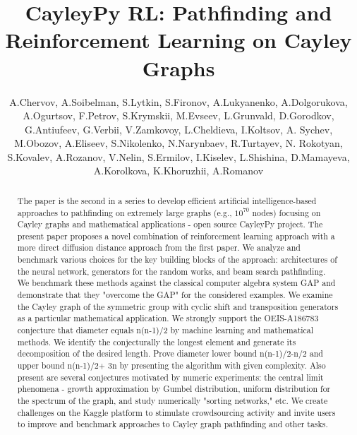 \documentclass[atmp]{ipart_v1}
\numberwithin{equation}{section}
\theoremstyle{plain}%
\begin{document}
\title[CayleyPY RL]{CayleyPy RL: Pathfinding and Reinforcement Learning on Cayley Graphs}


\author[A.Chervov,A.Soibelman,... ]{A.Chervov, 
A.Soibelman, S.Lytkin, S.Fironov, A.Lukyanenko, A.Dolgorukova, A.Ogurtsov,
F.Petrov, S.Krymskii, M.Evseev, L.Grunvald, D.Gorodkov, G.Antiufeev, G.Verbii, 
V.Zamkovoy, L.Cheldieva, I.Koltsov, A. Sychev, M.Obozov, 
A.Eliseev, S.Nikolenko, N.Narynbaev, R.Turtayev,
N. Rokotyan, S.Kovalev,
A.Rozanov, V.Nelin, S.Ermilov,
I.Kiselev, L.Shishina, D.Mamayeva, A.Korolkova,
K.Khoruzhii, A.Romanov }

\begin{abstract}


The paper is the second in a series to develop efficient artificial intelligence-based approaches to pathfinding on extremely large graphs (e.g., $10^{70}$ nodes) focusing on Cayley graphs and mathematical applications - open source CayleyPy project. The present paper proposes a novel combination of reinforcement learning approach with a more direct diffusion distance approach from the first paper. We analyze and benchmark various choices for the key building blocks of the approach:  architectures of the neural network, generators for the random works, and beam search pathfinding. We benchmark these methods against the classical computer algebra system GAP and demonstrate that they  "overcome the GAP" for the considered examples.
We examine the Cayley graph of the symmetric group with cyclic shift and transposition generators as a particular mathematical application. We strongly support the OEIS-A186783 conjecture that diameter equals n(n-1)/2 by machine learning and mathematical methods. We identify the conjecturally the longest element and generate its decomposition of the desired length. Prove diameter lower bound n(n-1)/2-n/2 and upper bound n(n-1)/2+ 3n by presenting the algorithm with given complexity. Also present are several conjectures motivated by numeric experiments: the central limit phenomena - growth approximation by Gumbel distribution, uniform distribution for the spectrum of the graph, and study numerically  "sorting networks," etc. 
We create challenges on the Kaggle platform to stimulate crowdsourcing activity and invite users to improve and benchmark approaches to Cayley graph pathfinding and other tasks.








\end{abstract}
\end{document}
